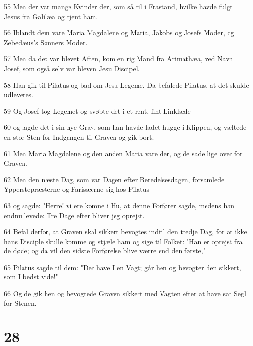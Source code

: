 \par 55 Men der var mange Kvinder der, som så til i Frastand, hvilke havde fulgt Jesus fra Galilæa og tjent ham.
\par 56 Iblandt dem vare Maria Magdalene og Maria, Jakobs og Josefs Moder, og Zebedæus's Sønners Moder.
\par 57 Men da det var blevet Aften, kom en rig Mand fra Arimathæa, ved Navn Josef, som også selv var bleven Jesu Discipel.
\par 58 Han gik til Pilatus og bad om Jesu Legeme. Da befalede Pilatus, at det skulde udleveres.
\par 59 Og Josef tog Legemet og svøbte det i et rent, fint Linklæde
\par 60 og lagde det i sin nye Grav, som han havde ladet hugge i Klippen, og væltede en stor Sten for Indgangen til Graven og gik bort.
\par 61 Men Maria Magdalene og den anden Maria vare der, og de sade lige over for Graven.
\par 62 Men den næste Dag, som var Dagen efter Beredelsesdagen, forsamlede Ypperstepræsterne og Farisæerne sig hos Pilatus
\par 63 og sagde: "Herre! vi ere komne i Hu, at denne Forfører sagde, medens han endnu levede: Tre Dage efter bliver jeg oprejst.
\par 64 Befal derfor, at Graven skal sikkert bevogtes indtil den tredje Dag, for at ikke hans Disciple skulle komme og stjæle ham og sige til Folket: "Han er oprejst fra de døde; og da vil den sidste Forførelse blive værre end den første,"
\par 65 Pilatus sagde til dem: "Der have I en Vagt; går hen og bevogter den sikkert, som I bedst vide!"
\par 66 Og de gik hen og bevogtede Graven sikkert med Vagten efter at have sat Segl for Stenen.

\chapter{28}

